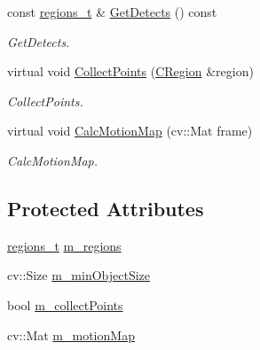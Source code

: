 \begin{DoxyCompactItemize}
const \mbox{\hyperlink{defines_8h_a01db0de56a20f4342820a093c5154536}{regions\+\_\+t}} \& \mbox{\hyperlink{class_base_detector_a52ac4b2feed15a47de84a69eb45c233f}{Get\+Detects}} () const
\begin{DoxyCompactList}\small\item\em Get\+Detects. \end{DoxyCompactList}\item 
virtual void \mbox{\hyperlink{class_base_detector_a20380b0980c6f262b0829f37fb89d2a7}{Collect\+Points}} (\mbox{\hyperlink{class_c_region}{C\+Region}} \&region)
\begin{DoxyCompactList}\small\item\em Collect\+Points. \end{DoxyCompactList}\item 
virtual void \mbox{\hyperlink{class_base_detector_a73c66f0d4dad263fcf65c09a6f6feda2}{Calc\+Motion\+Map}} (cv\+::\+Mat frame)
\begin{DoxyCompactList}\small\item\em Calc\+Motion\+Map. \end{DoxyCompactList}\end{DoxyCompactItemize}
\subsection*{Protected Attributes}
\begin{DoxyCompactItemize}
\item 
\mbox{\hyperlink{defines_8h_a01db0de56a20f4342820a093c5154536}{regions\+\_\+t}} \mbox{\hyperlink{class_base_detector_a409c20093acba261db8354ca72058fce}{m\+\_\+regions}}
\item 
cv\+::\+Size \mbox{\hyperlink{class_base_detector_a651b938c89c94daac4763728637d90c9}{m\+\_\+min\+Object\+Size}}
\item 
bool \mbox{\hyperlink{class_base_detector_a403cbf784fcb960bdb7d080c86c4a2ea}{m\+\_\+collect\+Points}}
\item 
cv\+::\+Mat \mbox{\hyperlink{class_base_detector_a45a2d54a0b69e271aa5c44ee301682b7}{m\+\_\+motion\+Map}}
\end{DoxyCompactItemize}

